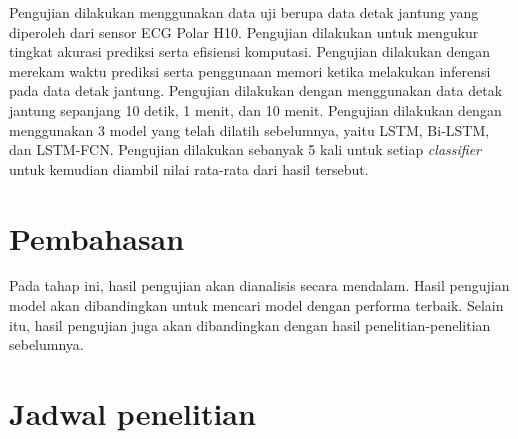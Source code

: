 
Pengujian dilakukan menggunakan data uji berupa data detak jantung yang diperoleh dari sensor ECG Polar H10. 
Pengujian dilakukan untuk mengukur tingkat akurasi prediksi serta efisiensi komputasi. 
Pengujian dilakukan dengan merekam waktu prediksi serta penggunaan memori ketika melakukan inferensi pada data detak jantung.
Pengujian dilakukan dengan menggunakan data detak jantung sepanjang 10 detik, 1 menit, dan 10 menit. Pengujian dilakukan dengan menggunakan 3 model yang telah dilatih sebelumnya, yaitu LSTM, Bi-LSTM, dan LSTM-FCN. Pengujian dilakukan sebanyak 5 kali untuk setiap \textit{classifier} untuk kemudian diambil nilai rata-rata dari hasil tersebut.

\section{Pembahasan}
\label{subsec: metodologi-pembahasan}

Pada tahap ini, hasil pengujian akan dianalisis secara mendalam.
Hasil pengujian model akan dibandingkan untuk mencari model dengan performa terbaik.
Selain itu, hasil pengujian juga akan dibandingkan dengan hasil penelitian-penelitian sebelumnya.

\section{Jadwal penelitian}
\label{subsec:label}

\begin{figure}[tph]
\end{figure}
